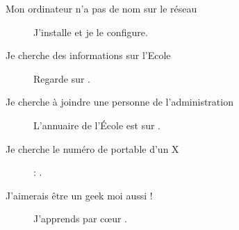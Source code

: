 \begin{description}
\item[Mon ordinateur n'a pas de nom sur le réseau] J'installe  et je le configure.

\item[Je cherche des informations sur l'Ecole] Regarde sur .

\item[Je cherche à joindre une personne de l'administration] L'annuaire de l'École est sur \linebreak{} .

\item[Je cherche le numéro de portable d'un X] : .

\item[J'aimerais être un geek moi aussi !] J'apprends par c\oe ur .

\end{description}
